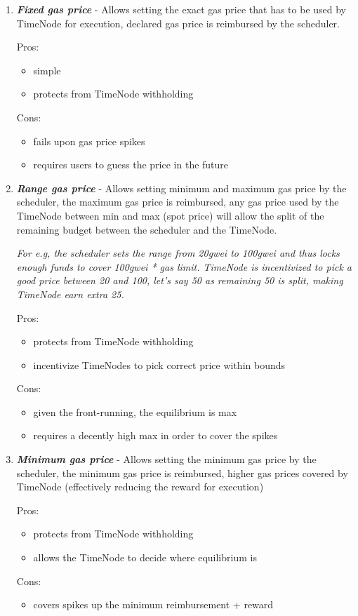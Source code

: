\documentclass{report}
\begin{document}
  \begin{enumerate}
    \item
      \textbf{\textit{Fixed gas price}} - Allows setting the exact gas price that has to be used by TimeNode for execution, declared gas price is reimbursed by the scheduler.

      Pros:
      \begin{itemize}
        \item simple
        \item protects from TimeNode withholding
      \end{itemize}
      Cons:
      \begin{itemize}
        \item fails upon gas price spikes
        \item requires users to guess the price in the future
      \end{itemize}

    \item
      \textbf{\textit{Range gas price}} - Allows setting minimum and maximum gas price by the scheduler, the maximum gas price is reimbursed, any gas price used by the TimeNode between min and max (spot price) will allow the split of the remaining budget between the scheduler and the TimeNode.

      \textit{For e.g, the scheduler sets the range from 20gwei to 100gwei and thus locks enough funds to cover 100gwei * gas limit. TimeNode is incentivized to pick a good price between 20 and 100, let’s say 50 as remaining 50 is split, making TimeNode earn extra 25.}

      Pros:
      \begin{itemize}
        \item protects from TimeNode withholding
        \item incentivize TimeNodes to pick correct price within bounds
      \end{itemize}
      Cons:
      \begin{itemize}
        \item given the front-running, the equilibrium is max
        \item requires a decently high max in order to cover the spikes
      \end{itemize}

    \item
      \textbf{\textit{Minimum gas price}} - Allows setting the minimum gas price by the scheduler, the minimum gas price is reimbursed, higher gas prices covered by TimeNode (effectively reducing the reward for execution)

      Pros:
      \begin{itemize}
        \item protects from TimeNode withholding
        \item allows the TimeNode to decide where equilibrium is
      \end{itemize}
      Cons:
      \begin{itemize}
        \item covers spikes up the minimum reimbursement + reward
      \end{itemize}
  \end{enumerate}
\end{document}

